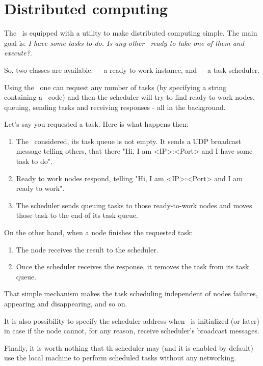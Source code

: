 \section{Distributed computing}


The \ShellName\ is equipped with a utility to make distributed computing simple. The main goal is: \textit{I have some tasks to do. Is any other \ShellName\ ready to take one of them and execute?}. 

So, two classes are available: \RemoteAioNode\ - a ready-to-work instance, and \RemoteAioScheduler\ - a task scheduler.

Using the \RemoteAioScheduler\ one can request any number of tasks (by specifying a string containing a \ShellName\ code) and then the scheduler will try to find ready-to-work nodes, queuing, sending tasks and receiving responses - all in the background.

Let's say you requested a task. Here is what happens then:
\begin{enumerate}
	\item The \RemoteAioScheduler\ considered, its task queue is not empty. It sends a UDP broadcast message telling others, that there "Hi, I am <IP>:<Port> and I have some task to do".
	\item Ready to work nodes respond, telling "Hi, I am <IP>:<Port> and I am ready to work".
	\item The scheduler sends queuing tasks to those ready-to-work nodes and moves those task to the end of its task queue.
\end{enumerate}
On the other hand, when a node finishes the requested task:
\begin{enumerate}
	\item The node receives the result to the scheduler.
	\item Once the scheduler receives the response, it removes the task from its task queue.
\end{enumerate}
That simple mechanism makes the task scheduling independent of nodes failures, appearing and disappearing, and so on.

It is also possibility to specify the scheduler address when \RemoteAioNode\ is initialized (or later) in case if the node cannot, for any reason, receive scheduler's broadcast messages.

Finally, it is worth nothing that th scheduler may (and it is enabled by default) use the local machine to perform scheduled tasks without any networking.

